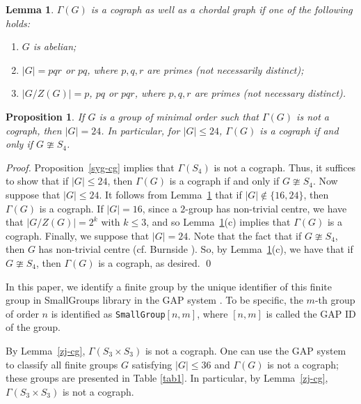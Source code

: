 \documentclass{elsarticle}
\newtheorem{prop}[theorem]{Proposition}
\newtheorem{lemma}[theorem]{Lemma}
\begin{document}
\begin{lemma}\label{sg-pdc}
$\Gamma(G)$ is a cograph as well as a chordal graph if one of the following holds{\rm:}
\begin{enumerate}
\item $G$ is abelian;
\item $|G|=pqr$ or $pq$, where $p,q,r$ are primes {\rm(}not necessarily distinct{\rm);}
\item $|G/Z(G)|=p$, $pq$ or $pqr$, where $p,q,r$ are primes {\rm(}not necessary distinct{\rm)}.
\end{enumerate}
\end{lemma}

\begin{prop}\label{mini-cog}
If $G$ is a group of minimal order such that $\Gamma(G)$ is not a cograph, then $|G|=24$. In particular, for $|G|\le 24$, $\Gamma(G)$ is a cograph if and only if $G\ncong S_4$.
\end{prop}

\begin{proof}
Proposition~\ref{syg-cg} implies that $\Gamma(S_4)$ is not a cograph. Thus, it suffices to show that if $|G|\le 24$, then $\Gamma(G)$ is a cograph if and only if $G\ncong S_4$. Now suppose that $|G|\le 24$. It follows from Lemma~\ref{sg-pdc} that if $|G|\notin \{16,24\}$, then $\Gamma(G)$ is a cograph.
If $|G|=16$, since a $2$-group has non-trivial centre, we have that $|G/Z(G)|=2^k$ with $k\le 3$, and so Lemma~\ref{sg-pdc}(c) implies that $\Gamma(G)$ is a cograph. Finally, we suppose that $|G|=24$. Note that the fact that if $G\ncong S_4$, then $G$ has non-trivial centre (cf. Burnside \cite{Bur11}). So, by  Lemma~\ref{sg-pdc}(c), we have that if $G\ncong S_4$, then $\Gamma(G)$ is a cograph, as desired. \qed
\end{proof}

In this paper, we identify a finite group by the unique identifier of this finite group in {\sc SmallGroups} library  in the \textsf{GAP} system \cite{gap}.
To be specific,
the $m$-th group of order $n$ is identified as \texttt{SmallGroup}$[n,m]$, where $[n,m]$ is called the GAP ID of the group.


By Lemma~\ref{zj-cg}, $\Gamma(S_3\times S_3)$ is not a cograph.
One can use the \textsf{GAP} system \cite{gap} to classify all finite groups $G$ satisfying $|G|\le 36$ and $\Gamma(G)$ is not a cograph; these groups are presented in Table \ref{tab1}.
In particular, by Lemma~\ref{zj-cg}, $\Gamma(S_3\times S_3)$ is not a cograph.
\end{document}
